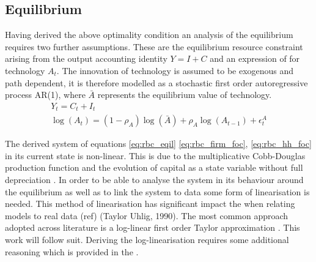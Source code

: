 \documentclass[12pt,a4paper,english]{article} %
\begin{document}
	\subsection{Equilibrium}
	Having derived the above optimality condition an analysis of the equilibrium requires two further assumptions. These are the equilibrium resource constraint arising from the output accounting identity $Y = I + C$ and an expression of for technology $A_t$. The innovation of technology is assumed to be exogenous and path dependent, it is therefore modelled as a stochastic first order autoregressive process AR(1), where $\bar{A}$ represents the equilibrium value of technology.
	\begin{equation} \label{eq:rbc_eqil}
		\begin{aligned}
			Y_t = C_t + I_t \\
			\log(A_t) = (1- \rho_A) \log(\bar{A}) + \rho_A \log(A_{t-1}) + \epsilon_t^A
		\end{aligned}
	\end{equation}

	The derived system of equations \eqref{eq:rbc_eqil} \eqref{eq:rbc_firm_foc}, \eqref{eq:rbc_hh_foc} in its current state is non-linear. This is due to the multiplicative Cobb-Douglas production function and the evolution of capital as a state variable without full depreciation \cite{campbell_inspecting_1994}. In order to be able to analyse the system in its behaviour around the equilibrium as well as to link the system to data some form of linearisation is needed. This method of linearisation has significant impact the when relating models to real data (ref) (Taylor  Uhlig, 1990). The most common approach adopted across literature is a log-linear first order Taylor approximation \cite{campbell_inspecting_1994}. This work will follow suit.
	Deriving the log-linearisation requires some additional reasoning which is provided in the .
	
\end{document}
